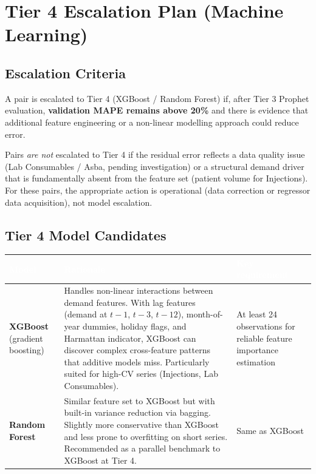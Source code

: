 \documentclass[12pt, a4paper]{article}
\begin{document}
\section{Tier 4 Escalation Plan (Machine Learning)}
\label{sec:tier4}

\subsection{Escalation Criteria}

A pair is escalated to Tier 4 (XGBoost / Random Forest) if, after
Tier 3 Prophet evaluation, \textbf{validation MAPE remains above 20\%}
and there is evidence that additional feature engineering or a
non-linear modelling approach could reduce error.

Pairs \textit{are not} escalated to Tier 4 if the residual error
reflects a data quality issue (Lab Consumables / Asba, pending
investigation) or a structural demand driver that is fundamentally
absent from the feature set (patient volume for Injections). For these
pairs, the appropriate action is operational (data correction or
regressor data acquisition), not model escalation.

\subsection{Tier 4 Model Candidates}

\vspace{0.4em}
\noindent
\begin{tabularx}{\textwidth}{@{} L{4.0cm} X L{2.8cm} @{}}
  \toprule
  \textcolor{white}{\textbf{Model}} &
  \textcolor{white}{\textbf{Rationale}} &
  \textcolor{white}{\textbf{Key requirement}} \\
  \midrule
  \textbf{XGBoost} (gradient boosting) &
    Handles non-linear interactions between demand features. With
    lag features (demand at $t-1$, $t-3$, $t-12$), month-of-year
    dummies, holiday flags, and Harmattan indicator, XGBoost can
    discover complex cross-feature patterns that additive models miss.
    Particularly suited for high-CV series (Injections, Lab Consumables). &
    At least 24 observations for reliable feature importance estimation \\
  \textbf{Random Forest} &
    Similar feature set to XGBoost but with built-in variance
    reduction via bagging. Slightly more conservative than XGBoost
    and less prone to overfitting on short series. Recommended as
    a parallel benchmark to XGBoost at Tier 4. &
    Same as XGBoost \\
  \bottomrule
\end{tabularx}
\end{document}
